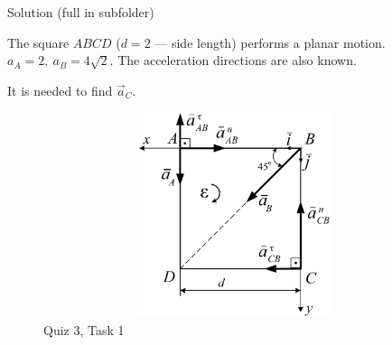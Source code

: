 \documentclass[aspectratio=169,xcolor=table,10pt, notes=hide]{beamer}
\begin{document}
  \begin{frame}[t]{Solution (full in subfolder)}
    \begin{minipage}{0.6\textwidth}
        The square $ABCD$ ($d=2$ --- side length) performs a planar motion. $a_A = 2,\ a_B = 4\sqrt{2}$. The acceleration directions are also known.
    
        It is needed to find $\vec{a}_C$.
    \end{minipage}
    \begin{minipage}{0.39\textwidth}
        \vspace{-0.5cm}
        \begin{figure}[H]
        \centering\includegraphics[height=6cm,width=1\textwidth,keepaspectratio]{quiz3_filled_fig.png}
        \caption*{Quiz 3, Task 1}
        \end{figure}
    \end{minipage}
    \end{frame}
\end{document}
